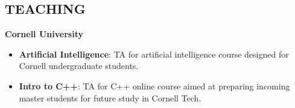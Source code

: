 \documentclass[margin, 10pt]{res} %
\begin{document}
\begin{resume}
%
%
%

\section{TEACHING}
\textbf{Cornell University}
\begin{itemize}
\item \textbf{Artificial Intelligence}: TA for artificial intelligence course designed for Cornell undergraduate students.
\item \textbf{Intro to C++}: TA for C++ online course aimed at preparing incoming master students for future study in Cornell Tech. 
\end{itemize}


\end{resume}
\end{document}
